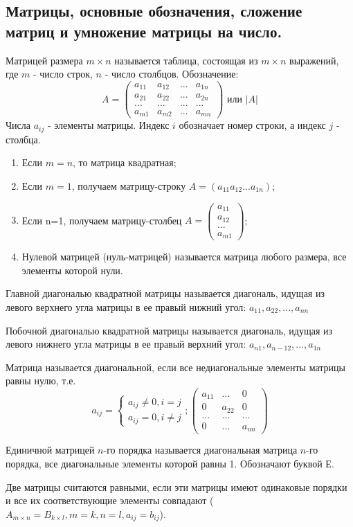 \documentclass[a4paper,14pt]{article}
\begin{document}
\subsection{Матрицы, основные обозначения, сложение матриц и умножение матрицы на число.}
Матрицей размера $m \times n$ называется таблица, состоящая из $m \times n$ выражений, где $m$ - число строк, $n$ - число столбцов.
\noindent Обозначение:
\[
A=
\begin{pmatrix}
	a_{11} & a_{12} & ... & a_{1n} \\
	a_{21} & a_{22} & ... & a_{2n} \\
	... & ... & ... & ... \\
	a_{m1} & a_{m2} & ... & a_{mn} 
\end{pmatrix}
\text{ или } |A|
\]
\noindent Числа $a_{ij}$ - элементы матрицы. Индекс $i$ обозначает номер строки, а индекс $j$ - столбца.
\begin{enumerate}
	\item Если $m=n$, то матрица квадратная;
	\item Если $m=1$, получаем матрицу-строку $A=\left(a_{11} a_{12} ... a_{1n}\right)$;
	\item Если n=1, получаем матрицу-столбец $A=\begin{pmatrix}a_{11} \\ a_{12} \\ ... \\ a_{m1}\end{pmatrix}$;
	\item Нулевой матрицей (нуль-матрицей) называется матрица любого размера, все элементы которой нули.
\end{enumerate}
\begin{definition}
	Главной диагональю квадратной матрицы называется диагональ, идущая из левого верхнего угла матрицы в ее правый нижний угол: $a_{11}, a_{22},...,a_{nn}$
\end{definition}
\begin{definition}
	Побочной диагональю квадратной матрицы называется диагональ, идущая из левого нижнего угла матрицы в ее правый верхний угол: $a_{n1}, a_{n-12},...,a_{1n}$
\end{definition}
\begin{definition}
	Матрица называется диагональной, если все недиагональные элементы матрицы равны нулю, т.е.
	\[
	a_{ij}=
	\begin{cases}
		a_{ij} \ne 0, i = j \\
		a_{ij} =0, i \ne j 
	\end{cases};
	\begin{pmatrix}
		a_{11} & ... & 0 \\
		0 & a_{22} & 0 \\
		... & ... & ... \\
		0 & ... & a_{nn}
	\end{pmatrix}
	\]
	
	Единичной матрицей $n$-го порядка называется диагональная матрица $n$-го порядка, все диагональные элементы которой равны 1. Обозначают буквой $Е$.
\end{definition}
Две матрицы считаются равными, если эти матрицы имеют одинаковые порядки и все их соответствующие элементы совпадают ($A_{m \times n} = B_{k \times l}, m=k, n=l, a_{ij}=b_{ij}$).
\end{document}
